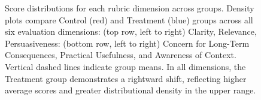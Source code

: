 \begin{figure}[t]
  \caption{
    Score distributions for each rubric dimension across groups.
    Density plots compare Control (red) and Treatment (blue) groups across all six evaluation dimensions: (top row, left to right) Clarity, Relevance, Persuasiveness: (bottom row, left to right) Concern for Long-Term Consequences, Practical Usefulness, and Awareness of Context. Vertical dashed lines indicate group means. In all dimensions, the Treatment group demonstrates a rightward shift, reflecting higher average scores and greater distributional density in the upper range.
  }
  \label{fig:distributions}
\end{figure}
